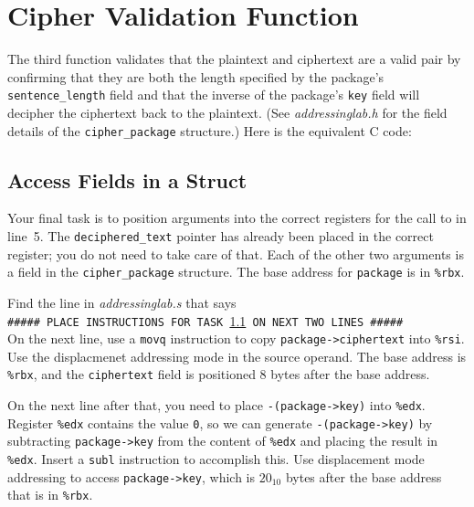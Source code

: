 \section{Cipher Validation Function}

The third function validates that the plaintext and ciphertext are a valid pair
by confirming that they are both the length specified by the package's
\lstinline{sentence_length} field and that the inverse of the package's
\lstinline{key} field will decipher the ciphertext back to the plaintext. (See
\textit{addressinglab.h} for the field details of the
\lstinline{cipher_package} structure.) Here is the equivalent C code:



\subsection{Access Fields in a Struct}\label{task8}

Your final task is to position arguments into the correct registers for the
call to  in line~5. The \lstinline{deciphered_text}
pointer has already been placed in the correct register; you do not need to
take care of that. Each of the other two arguments is a field in the
\lstinline{cipher_package} structure. The base address for \lstinline{package}
is in \lstinline{%rbx}.

Find the line in \textit{addressinglab.s} that says \\
\texttt{\#\#\#\#\# PLACE INSTRUCTIONS FOR TASK \ref{task8} ON NEXT TWO LINES \#\#\#\#\#} \\
On the next line, use a \lstinline{movq} instruction to copy
\lstinline{package->ciphertext} into \lstinline{%rsi}. Use the displacmenet
addressing mode in the source operand. The base address is \lstinline{%rbx},
and the \lstinline{ciphertext} field is positioned 8 bytes after the base
address.

On the next line after that, you need to place \lstinline{-(package->key)} into
\lstinline{%edx}. Register \lstinline{%edx} contains the value \lstinline{0},
so we can generate \lstinline{-(package->key)} by subtracting
\lstinline{package->key} from the content of \lstinline{%edx} and placing the
result in \lstinline{%edx}. Insert a \lstinline{subl} instruction to accomplish
this. Use displacement mode addressing to access \lstinline{package->key}, which
is $20_{10}$ bytes after the base address that is in \lstinline{%rbx}.

